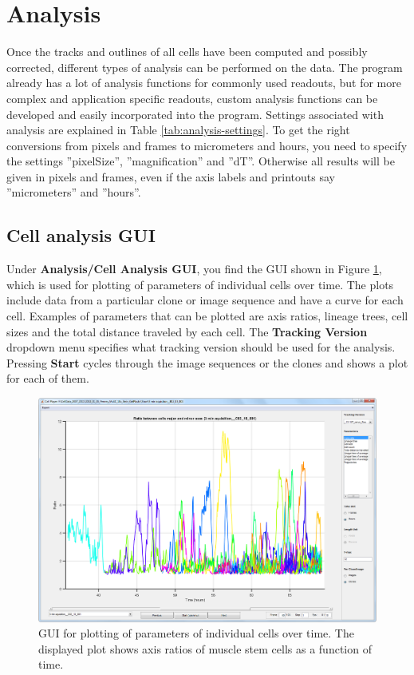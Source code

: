 \documentclass[a4paper, oneside, onecolumn, 11pt]{article}
\newcommand{\menu}[1]{\textbf{#1}}
\newcommand{\setting}[1]{''#1''}
\newcommand{\control}[1]{\textbf{#1}}
\begin{document}
\section{Analysis}
Once the tracks and outlines of all cells have been computed and possibly corrected, different types of analysis can be performed on the data. The program already has a lot of analysis functions for commonly used readouts, but for more complex and application specific readouts, custom analysis functions can be developed and easily incorporated into the program. Settings associated with analysis are explained in Table \ref{tab:analysis-settings}. To get the right conversions from pixels and frames to micrometers and hours, you need to specify the settings \setting{pixelSize}, \setting{magnification} and \setting{dT}. Otherwise all results will be given in pixels and frames, even if the axis labels and printouts say ''micrometers'' and ''hours''.

\subsection{Cell analysis GUI}
Under \menu{Analysis/\allowbreak Cell Analysis GUI}, you find the GUI shown in Figure \ref{fig:cell-analysis-GUI}, which is used for plotting of parameters of individual cells over time. The plots include data from a particular clone or image sequence and have a curve for each cell. Examples of parameters that can be plotted are axis ratios, lineage trees, cell sizes and the total distance traveled by each cell. The \control{Tracking Version} dropdown menu specifies what tracking version should be used for the analysis. Pressing \control{Start} cycles through the image sequences or the clones and shows a plot for each of them.

\begin{figure}[!htb]
\begin{center}
\includegraphics[width = \columnwidth]{figures/cellAnalysisGUI}
\caption{GUI for plotting of parameters of individual cells over time. The displayed plot shows axis ratios of muscle stem cells as a function of time.}
\label{fig:cell-analysis-GUI}
\end{center}
\end{figure}
\end{document}
